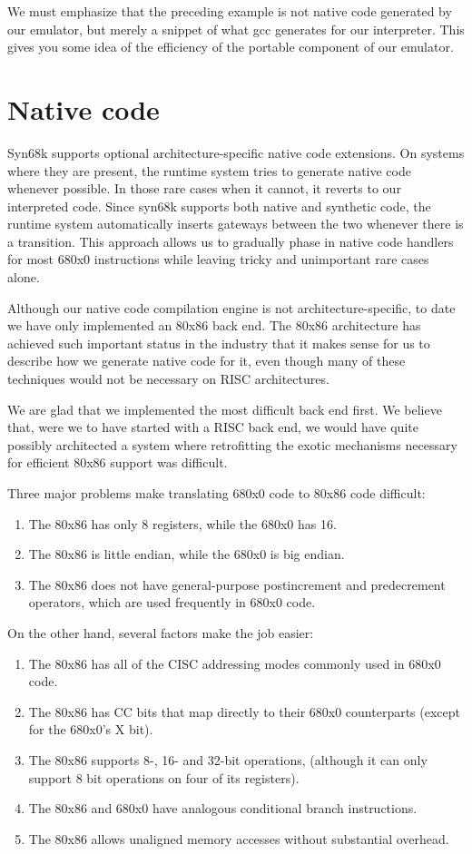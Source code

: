 We must emphasize that the preceding example is not native code
generated by our emulator, but merely a snippet of what gcc generates
for our interpreter.  This gives you some idea of the efficiency
of the portable component of our emulator.

\section{Native code}

Syn68k supports optional architecture-specific native code extensions.
On systems where they are present, the runtime system tries to
generate native code whenever possible.  In those rare cases when
it cannot, it reverts to our interpreted code.  Since syn68k supports
both native and synthetic code, the runtime system automatically
inserts gateways between the two whenever there is a transition.
This approach allows us to gradually phase in native code handlers
for most 680x0 instructions while leaving tricky and unimportant
rare cases alone.

Although our native code compilation engine is not architecture-specific,
to date we have only implemented an 80x86 back end.  The 80x86
architecture has achieved such important status in the industry
that it makes sense for us to describe how we generate native code
for it, even though many of these techniques would not be necessary
on RISC architectures.

We are glad that we implemented the most difficult back end first.
We believe that, were we to have started with a RISC back end, we
would have quite possibly architected a system where retrofitting
the exotic mechanisms necessary for efficient 80x86 support was
difficult.

Three major problems make translating 680x0 code to 80x86 code difficult:

\begin{enumerate}
\item The 80x86 has only 8 registers, while the 680x0 has 16.
\item The 80x86 is little endian, while the 680x0 is big endian.
\item The 80x86 does not have general-purpose postincrement and predecrement
   operators, which are used frequently in 680x0 code.
\end{enumerate}

On the other hand, several factors make the job easier:

\begin{enumerate}
\item The 80x86 has all of the CISC addressing modes commonly used in 680x0 code.
\item The 80x86 has CC bits that map directly to their 680x0 counterparts
   (except for the 680x0's X bit).
\item The 80x86 supports 8-, 16- and 32-bit operations, (although it can only
   support 8 bit operations on four of its registers).
\item The 80x86 and 680x0 have analogous conditional branch instructions.
\item The 80x86 allows unaligned memory accesses without substantial overhead.
\end{enumerate}

